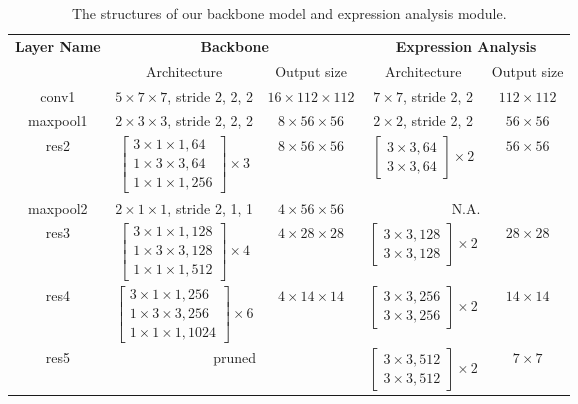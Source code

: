 \documentclass[VANCOUVER,STIX1COL]{WileyNJD-v2}
\begin{document}
\begin{table}[htb]
  \centering
  \caption{The structures of our backbone model and expression analysis module.}
  \label{t:model_structure}
  \begin{tabular}{ccccc}
  \toprule
  \multirow{2}{*}{\textbf{Layer Name}} &
  \multicolumn{2}{c}{\textbf{Backbone}} &
  \multicolumn{2}{c}{\textbf{Expression Analysis}} \\
  \cmidrule(lr){2-3} \cmidrule(lr){4-5}
  & Architecture & Output size & Architecture & Output size \\
  \midrule
  conv1 &
  $5\times7\times7$, stride 2, 2, 2 &
  $16\times112\times112$ &
  $7\times7$, stride 2, 2 &
  $112\times112$ \\
  \midrule
  maxpool1 &
  $2\times3\times3$, stride 2, 2, 2 &
  $8\times56\times56$ &
  $2\times2$, stride 2, 2 &
  $56\times56$ \\
  \midrule
  res2 &
  $\left[ \begin{array}{c} 3\times1\times1, 64 \\ 1\times3\times3, 64 \\ 1\times1\times1, 256 \end{array}\right]\times3$ &
  $8\times56\times56$ &
  $\left[ \begin{array}{c} 3\times3, 64 \\ 3\times3, 64 \end{array}\right]\times2$ &
  $56\times56$ \\
  \midrule
  maxpool2 &
  $2\times1\times1$, stride 2, 1, 1 &
  $4\times56\times56$ &
  \multicolumn{2}{c}{N.A.} \\
  \midrule
  res3 &
  $\left[ \begin{array}{c} 3\times1\times1, 128 \\ 1\times3\times3, 128 \\ 1\times1\times1, 512 \end{array}\right]\times4$ &
  $4\times28\times28$ &
  $\left[ \begin{array}{c} 3\times3, 128 \\ 3\times3, 128 \end{array}\right]\times2$ &
  $28\times28$ \\
  \midrule
  res4 &
  $\left[ \begin{array}{c} 3\times1\times1, 256 \\ 1\times3\times3, 256 \\ 1\times1\times1, 1024 \end{array}\right]\times6$ &
  $4\times14\times14$ &
  $\left[ \begin{array}{c} 3\times3, 256 \\ 3\times3, 256 \end{array}\right]\times2$ &
  $14\times14$ \\
  \midrule
  res5 &
  \multicolumn{2}{c}{pruned} &
  $\left[ \begin{array}{c} 3\times3, 512 \\ 3\times3, 512 \end{array}\right]\times2$ &
  $7\times7$ \\
  \bottomrule
  \end{tabular}
\end{table}
\end{document}
